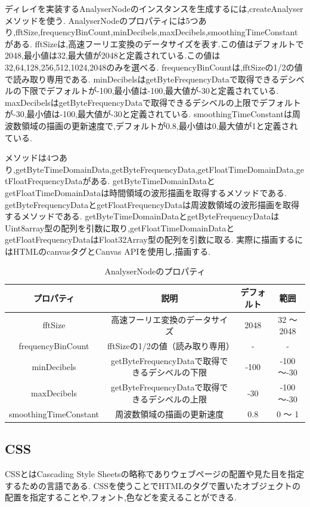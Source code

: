 \documentclass[12pt,a4j,titlepage]{ltjsarticle}
\begin{document}
ディレイを実装するAnalyserNodeのインスタンスを生成するには,createAnalyserメソッドを使う.
AnalyserNodeのプロパティには5つあり,fftSize,frequencyBinCount,minDecibels,maxDecibels,smoothingTimeConstantがある.
fftSizeは,高速フーリエ変換のデータサイズを表す.この値はデフォルトで2048,最小値は32,最大値が2048と定義されている.この値は32,64,128,256,512,1024,2048のみを選べる.
frequencyBinCountは,fftSizeの1/2の値で読み取り専用である.
minDecibelsはgetByteFrequencyDataで取得できるデシベルの下限でデフォルトが-100,最小値は-100,最大値が-30と定義されている.
maxDecibelsはgetByteFrequencyDataで取得できるデシベルの上限でデフォルトが-30,最小値は-100,最大値が-30と定義されている.
smoothingTimeConstantは周波数領域の描画の更新速度で,デフォルトが0.8,最小値は0,最大値が1と定義されている.

メソッドは4つあり,getByteTimeDomainData,getByteFrequencyData,getFloatTimeDomainData,getFloatFrequencyDataがある.
getByteTimeDomainDataとgetFloatTimeDomainDataは時間領域の波形描画を取得するメソッドである.
getByteFrequencyDataとgetFloatFrequencyDataは周波数領域の波形描画を取得するメソッドである.
getByteTimeDomainDataとgetByteFrequencyDataはUint8array型の配列を引数に取り,getFloatTimeDomainDataとgetFloatFrequencyDataはFloat32Array型の配列を引数に取る.
実際に描画するにはHTMLのcanvasタグとCanvas APIを使用し,描画する.

\begin{table}[h]
  \centering
  \caption{AnalyserNodeのプロパティ}
  \label{table:AnalyserNode}
  \small
  \begin{tabular}{cccc}
    \hline
    プロパティ  & 説明 & デフォルト & 範囲    \\
    \hline \hline
    fftSize  & 高速フーリエ変換のデータサイズ & 2048 & 32 ～ 2048\\
    \hline
    frequencyBinCount  & fftSizeの1/2の値（読み取り専用） & - & -\\
    \hline
    minDecibels  & getByteFrequencyDataで取得できるデシベルの下限 & -100 & -100～-30\\
    \hline
    maxDecibels  &  getByteFrequencyDataで取得できるデシベルの上限 & -30 & -100～-30\\
    \hline
    smoothingTimeConstant  &  周波数領域の描画の更新速度 & 0.8 & 0 ～ 1\\
    \hline
  \end{tabular}
\end{table}

\subsection{CSS}
CSSとはCascading Style Sheetsの略称でありウェブページの配置や見た目を指定するための言語である\cite{css}.
CSSを使うことでHTMLのタグで置いたオブジェクトの配置を指定することや,フォント,色などを変えることができる.
\end{document}
